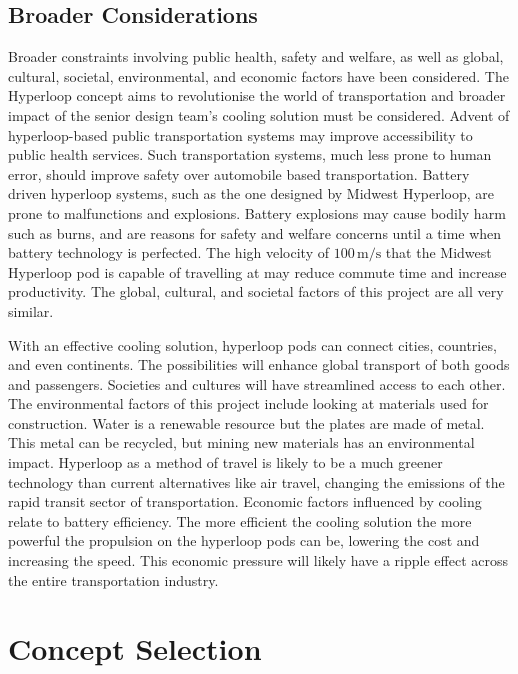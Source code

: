\documentclass[11pt]{article}
\numberwithin{equation}{subsection} %
\newcommand{\unit}[1]{\ensuremath{\, \mathrm{#1}}}             %
\begin{document}
\subsection{Broader Considerations}
Broader constraints involving public health, safety and welfare, as well as global, cultural, societal, environmental, and economic factors have been considered. The Hyperloop concept aims to revolutionise the world of transportation and broader impact of the senior design team's cooling solution must be considered. Advent of hyperloop-based public transportation systems may improve accessibility to public health services. Such transportation systems, much less prone to human error, should improve safety over automobile based transportation. Battery driven hyperloop systems, such as the one designed by Midwest Hyperloop, are prone to malfunctions and explosions. Battery explosions may cause bodily harm such as burns, and are reasons for safety and welfare concerns until a time when battery technology is perfected. The high velocity of $100\unit{m/s}$ that the Midwest Hyperloop pod is capable of travelling at may reduce commute time and increase productivity. The global, cultural, and societal factors of this project are all very similar.

With an effective cooling solution, hyperloop pods can connect cities, countries, and even continents. The possibilities will enhance global transport of both goods and passengers. Societies and cultures will have streamlined access to each other. The environmental factors of this project include looking at materials used for construction. Water is a renewable resource but the plates are made of metal. This metal can be recycled, but mining new materials has an environmental impact. Hyperloop as a method of travel is likely to be a much greener technology than current alternatives like air travel, changing the emissions of the rapid transit sector of transportation. Economic factors influenced by cooling relate to battery efficiency. The more efficient the cooling solution the more powerful the propulsion on the hyperloop pods can be, lowering the cost and increasing the speed. This economic pressure will likely have a ripple effect across the entire transportation industry.

\section{Concept Selection}
\end{document}
